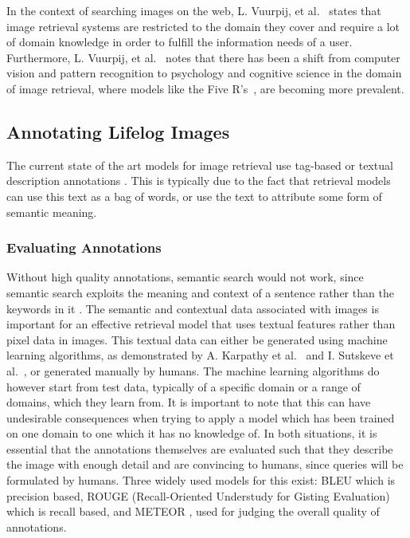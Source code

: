 \documentclass[12pt,a4paper]{article}
\begin{document}
In the context of searching images on the web,  L. Vuurpij, et al.~\cite{vuurpij2002vind} states that image retrieval systems are restricted to the domain they cover and require a lot of domain knowledge in order to fulfill the information needs of a user. Furthermore, L. Vuurpij, et al.~\cite{vuurpij2002vind} notes that there has been a shift from computer vision and pattern recognition to psychology and cognitive science in the domain of image retrieval, where models like the Five R's~\cite{gurrin2014lifelogging}, are becoming more prevalent. 

\subsection{Annotating Lifelog Images}
The current state of the art models for image retrieval use tag-based or textual description annotations \citep{ali2010semantically}. This is typically due to the fact that retrieval models can use this text as a bag of words, or use the text to attribute some form of semantic meaning.

\subsubsection{Evaluating Annotations}
Without high quality annotations, semantic search would not work, since semantic search exploits the meaning and context of a sentence rather than the keywords in it \cite{ali2010semantically}. The semantic and contextual data associated with images is important for an effective retrieval model that uses textual features rather than pixel data in images. This textual data can either be generated using machine learning algorithms, as demonstrated by A. Karpathy et al.~\cite{karpathy2015deep} and  I. Sutskeve et al.~\cite{sutskever2011generating}, or generated manually by humans. The machine learning algorithms do however start from test data, typically of a specific domain or a range of domains, which they learn from. It is important to note that this can have undesirable consequences when trying to apply a model which has been trained on one domain to one which it has no knowledge of. In both situations, it is essential that the annotations themselves are evaluated such that they describe the image with enough detail and are convincing to humans, since queries will be formulated by humans. Three widely used models for this exist: BLEU \citep{papineni2002bleu} which is precision based, ROUGE (Recall-Oriented Understudy for Gisting Evaluation) \citep{lin2004rouge} which is recall based, and METEOR \citep{elliott2013image}, used for judging the overall quality of annotations.
\end{document}
